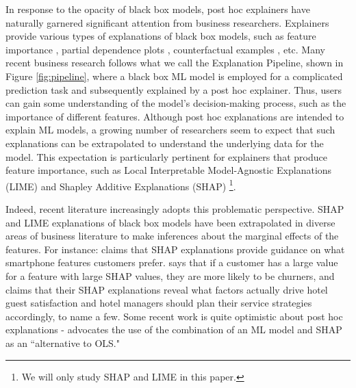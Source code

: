\documentclass[12pt]{article}  %
\begin{document}
In response to the opacity of black box models, post hoc explainers have naturally garnered significant attention from business researchers. Explainers provide various types of explanations of black box models, such as feature importance \citep{ribeiro16lime,lundberg17shap}, partial dependence plots \citep{friedman01pdp}, counterfactual examples \citep{mothilal20dice}, etc. Many recent business research follows what we call the Explanation Pipeline, shown in Figure \ref{fig:pipeline}, where a black box ML model is employed for a complicated prediction task and  subsequently explained by a post hoc explainer. Thus, users can gain some understanding of the model's decision-making process, such as the importance of different features. %
Although post hoc explanations are intended to explain ML models, a growing number of researchers seem to expect that such explanations can be extrapolated to understand the underlying data for the model. This expectation is particularly pertinent for explainers that produce feature importance, such as Local Interpretable Model-Agnostic Explanations (LIME) \citep{ribeiro16lime} and Shapley Additive Explanations (SHAP) \citep{lundberg17shap}\footnote{We will only study SHAP and LIME in this paper.}.


Indeed, recent literature increasingly adopts this problematic perspective. SHAP and LIME explanations of black box models have been extrapolated in diverse areas of business literature to make inferences about the marginal effects of the features. For instance: \cite{park2024extracting} claims that SHAP explanations provide guidance on what smartphone features customers prefer. \cite{jiang24churn} says that if a customer has a large value for a feature with large SHAP values, they are more likely to be churners, and \cite{sanchez2023role} claims that their SHAP explanations reveal what factors actually drive hotel guest satisfaction and hotel managers should plan their service strategies accordingly, to name a few. Some recent work is quite optimistic about post hoc explanations - \cite{berger2023supply} advocates the use of the combination of an ML model and SHAP as an ``alternative to OLS."
\end{document}
